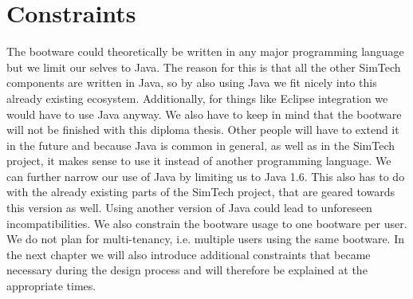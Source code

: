 \section{Constraints}

The bootware could theoretically be written in any major programming language but we limit our selves to Java.
The reason for this is that all the other SimTech components are written in Java, so by also using Java we fit nicely into this already existing ecosystem.
Additionally, for things like Eclipse integration we would have to use Java anyway.
We also have to keep in mind that the bootware will not be finished with this diploma thesis.
Other people will have to extend it in the future and because Java is common in general, as well as in the SimTech project, it makes sense to use it instead of another programming language.
We can further narrow our use of Java by limiting us to Java 1.6.
This also has to do with the already existing parts of the SimTech project, that are geared towards this version as well.
Using another version of Java could lead to unforeseen incompatibilities.
We also constrain the bootware usage to one bootware per user.
We do not plan for multi-tenancy, i.e. multiple users using the same bootware.
In the next chapter we will also introduce additional constraints that became necessary during the design process and will therefore be explained at the appropriate times.
